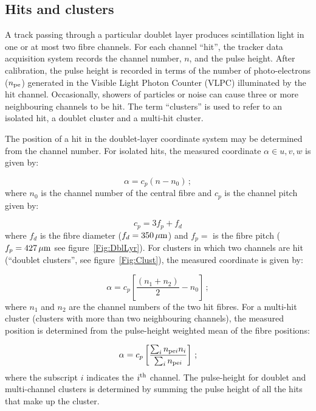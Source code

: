 \subsection{Hits and clusters}
\label{HtsClstrs}

A track passing through a particular doublet layer produces scintillation light in one or at most two fibre channels. For each channel ``hit'', the tracker data acquisition system records the channel number, $n$, and the pulse height. After calibration, the pulse height is recorded in terms of the number of photo-electrons ($n_{\rm pe}$) generated in the Visible Light Photon Counter (VLPC) illuminated by the hit channel. Occasionally, showers of particles or noise can cause three or more neighbouring channels to be hit. The term ``clusters'' is used to refer to an isolated hit, a doublet cluster and a multi-hit cluster.

The position of a hit in the doublet-layer coordinate system may be determined from the channel number. For isolated hits, the measured coordinate $\alpha \in {u, v, w}$ is given by:

\begin{equation}
  \alpha = c_p (n - n_0)\,;
\end{equation}
where $n_0$ is the channel number of the central fibre and $c_p$ is the channel pitch given by:

\begin{equation}
  c_p = 3f_p + f_d
\end{equation}
where $f_d$ is the fibre diameter ($f_d = 350\,\mu{\rm m}$) and $f_p = $ is the fibre pitch ($f_p = 427\,\mu{\rm m}$ see figure~\ref{Fig:DblLyr}). For clusters in which two channels are hit (``doublet clusters'', see figure~\ref{Fig:Clust}), the measured coordinate is given by:

\begin{equation}
  \alpha = c_p \left[ \frac{( n_1 + n_2)}{2} - n_0 \right]\,;
\end{equation}
where $n_1$ and $n_2$ are the channel numbers of the two hit fibres. For a multi-hit cluster (clusters with more than two neighbouring channels), the measured position is determined from the pulse-height weighted mean of the fibre positions:

\begin{equation}
  \alpha = c_p \left[ 
                 \frac{\sum_i n_{{\rm pe}i}n_i}{\sum_i n_{{\rm pe}i}} 
               \right]\,;
\end{equation}
where the subscript $i$ indicates the $i^{\rm th}$ channel. The pulse-height for doublet and multi-channel clusters is determined by summing the pulse height of all the hits that make up the cluster.

